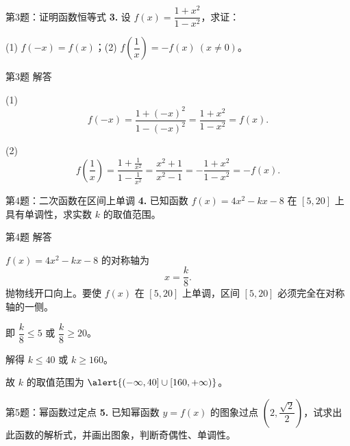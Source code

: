 \documentclass[10pt,aspectratio=169,serif,fleqn]{beamer}
\begin{document}
\begin{frame}[t]{第3题：证明函数恒等式}
\textbf{3.} 设 $f(x)=\dfrac{1+x^2}{1-x^2}$，求证：

\vspace{0.5em}
(1) $f(-x)=f(x)$；\hfil (2) $f\!\left(\dfrac1x\right)=-f(x)\ (x\ne0)$。
\end{frame}

\begin{frame}[t]{第3题 解答}
\begin{tcolorbox}[colback=orange!10,colframe=orange,title=\textbf{证明}]
(1)
\[
f(-x)=\frac{1+(-x)^2}{1-(-x)^2}=\frac{1+x^2}{1-x^2}=f(x).
\]

\vspace{0.8em}
(2)
\[
f\!\left(\frac1x\right)=\frac{1+\frac1{x^2}}{1-\frac1{x^2}}=\frac{x^2+1}{x^2-1}=-\frac{1+x^2}{1-x^2}=-f(x).
\]
\end{tcolorbox}
\end{frame}

\begin{frame}[t]{第4题：二次函数在区间上单调}
\textbf{4.} 已知函数 $f(x)=4x^2-kx-8$ 在 $[5,20]$ 上具有单调性，求实数 $k$ 的取值范围。
\end{frame}

\begin{frame}[t]{第4题 解答}
\begin{tcolorbox}[colback=orange!10,colframe=orange,title=\textbf{解}]
$f(x)=4x^2-kx-8$ 的对称轴为
\[
x=\frac{k}{8}.
\]
抛物线开口向上。要使 $f(x)$ 在 $[5,20]$ 上单调，区间 $[5,20]$ 必须完全在对称轴的一侧。

\vspace{0.5em}
即 $\dfrac{k}{8}\le5$ 或 $\dfrac{k}{8}\ge20$。

\vspace{0.3em}
解得 $k\le40$ 或 $k\ge160$。

\vspace{0.5em}
故 $k$ 的取值范围为 $\alert{(-\infty,40]\cup[160,+\infty)}$。
\end{tcolorbox}
\end{frame}

\begin{frame}[t]{第5题：幂函数过定点}
\textbf{5.} 已知幂函数 $y=f(x)$ 的图象过点 $\left(2,\dfrac{\sqrt{2}}{2}\right)$，试求出此函数的解析式，并画出图象，判断奇偶性、单调性。
\end{frame}
\end{document}
